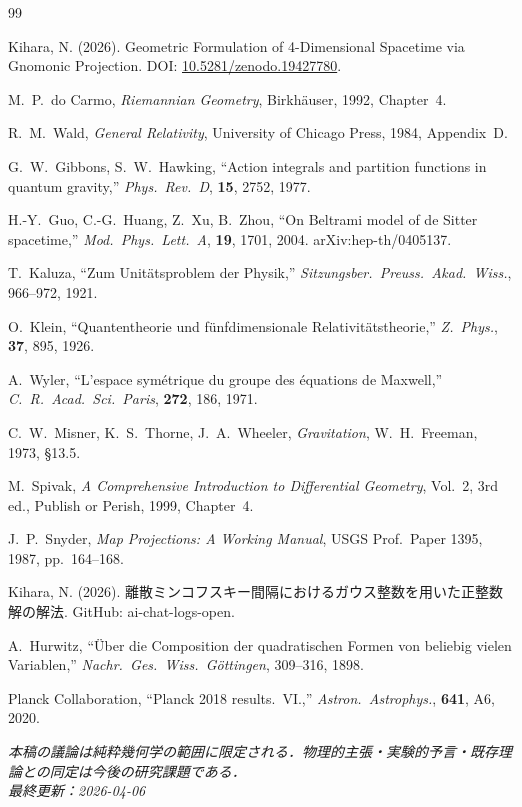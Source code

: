 \documentclass[12pt,a4paper]{ltjsarticle}
\begin{document}
\begin{thebibliography}{99}

Kihara, N. (2026). Geometric Formulation of 4-Dimensional Spacetime via Gnomonic Projection.
DOI: \href{https://doi.org/10.5281/zenodo.19427780}{10.5281/zenodo.19427780}.

M.~P.~do Carmo, \textit{Riemannian Geometry}, Birkh\"{a}user, 1992, Chapter~4.

R.~M.~Wald, \textit{General Relativity}, University of Chicago Press, 1984, Appendix~D.

G.~W.~Gibbons, S.~W.~Hawking, ``Action integrals and partition functions in quantum gravity,'' \textit{Phys.\ Rev.\ D}, \textbf{15}, 2752, 1977.

H.-Y.~Guo, C.-G.~Huang, Z.~Xu, B.~Zhou, ``On Beltrami model of de Sitter spacetime,'' \textit{Mod.\ Phys.\ Lett.\ A}, \textbf{19}, 1701, 2004. arXiv:hep-th/0405137.

T.~Kaluza, ``Zum Unit\"{a}tsproblem der Physik,'' \textit{Sitzungsber.\ Preuss.\ Akad.\ Wiss.}, 966--972, 1921.

O.~Klein, ``Quantentheorie und f\"{u}nfdimensionale Relativit\"{a}tstheorie,'' \textit{Z.\ Phys.}, \textbf{37}, 895, 1926.

A.~Wyler, ``L'espace sym\'{e}trique du groupe des \'{e}quations de Maxwell,'' \textit{C.\ R.\ Acad.\ Sci.\ Paris}, \textbf{272}, 186, 1971.

C.~W.~Misner, K.~S.~Thorne, J.~A.~Wheeler, \textit{Gravitation}, W.~H.~Freeman, 1973, \S13.5.

M.~Spivak, \textit{A Comprehensive Introduction to Differential Geometry}, Vol.~2, 3rd ed., Publish or Perish, 1999, Chapter~4.

J.~P.~Snyder, \textit{Map Projections: A Working Manual}, USGS Prof.\ Paper 1395, 1987, pp.~164--168.

Kihara, N. (2026). 離散ミンコフスキー間隔におけるガウス整数を用いた正整数解の解法. GitHub: ai-chat-logs-open.

A.~Hurwitz, ``\"{U}ber die Composition der quadratischen Formen von beliebig vielen Variablen,'' \textit{Nachr.\ Ges.\ Wiss.\ G\"{o}ttingen}, 309--316, 1898.

Planck Collaboration, ``Planck 2018 results.~VI.,'' \textit{Astron.\ Astrophys.}, \textbf{641}, A6, 2020.

\end{thebibliography}

\bigskip
\noindent\textit{本稿の議論は純粋幾何学の範囲に限定される．物理的主張・実験的予言・既存理論との同定は今後の研究課題である．}\\
\textit{最終更新：2026-04-06}
\end{document}
